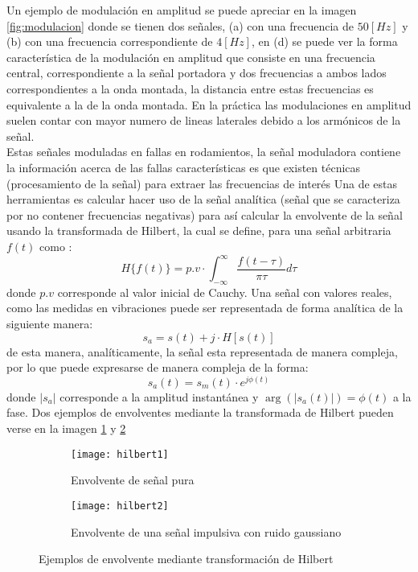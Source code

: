     			Un ejemplo de modulación en amplitud se puede apreciar en la imagen \ref{fig:modulacion} donde se tienen dos señales, (a) con una frecuencia de $50[Hz]$ y (b) con una frecuencia correspondiente de $4[Hz]$, en (d) se puede ver la forma característica de la modulación en amplitud que consiste en una frecuencia central, correspondiente a la señal portadora y dos frecuencias a ambos lados correspondientes a la onda montada, la distancia entre estas frecuencias es equivalente a la de la onda montada. En la práctica las modulaciones en amplitud suelen contar con mayor numero de lineas laterales debido a los armónicos de la señal.\\
    			
    			Estas señales moduladas en fallas en rodamientos, la señal moduladora contiene la información acerca de las fallas características es que existen técnicas (procesamiento de la señal) para extraer las frecuencias de interés Una de estas herramientas es calcular hacer uso de la señal analítica (señal que se caracteriza por no contener frecuencias negativas) para así calcular la envolvente de la señal usando la transformada de Hilbert, la cual se define, para una señal arbitraria $f(t)$ como \cite{Boashash1992}:
    			\begin{equation}
    				H \{f(t)\} = p.v \cdot \int_{-\infty}^{\infty} \frac{f(t-\tau)}{\pi \tau} d\tau
    			\end{equation}
    			donde $p.v$ corresponde al valor inicial de Cauchy. Una señal con valores reales, como las medidas en vibraciones puede ser representada de forma analítica de la siguiente manera:\\
    			\begin{equation}
    				s_{a}=s(t)+j \cdot H[s(t)]
    			\end{equation}
    			de esta manera, analíticamente, la señal esta representada de manera compleja, por lo que puede expresarse de manera compleja de la forma:\\
    			\begin{equation}
    				s_{a}(t) = s_{m}(t) \cdot e^{j\phi (t)}			
    			\end{equation}
    			donde $|s_{a}|$ corresponde a la amplitud instantánea y $\arg\left (|s_{a}(t)|\right )=\phi(t)$ a la fase. Dos ejemplos de envolventes mediante la transformada de Hilbert pueden verse en la imagen \ref{fig:hilbert1} y \ref{fig:hilbert2}
    			\begin{figure}[H]
    				\centering
    				\begin{subfigure}[b]{\linewidth}
    					\texttt{[image: hilbert1]}
    					\caption{Envolvente de señal pura}
    					\label{fig:hilbert1}
    				\end{subfigure}
    				\begin{subfigure}[b]{\linewidth}
    					\texttt{[image: hilbert2]}
    					\caption{Envolvente de una señal impulsiva con ruido gaussiano}
    					\label{fig:hilbert2}
    				\end{subfigure}
    				\caption{Ejemplos de envolvente mediante transformación de Hilbert}
    				\label{fig:hilbert}						
    			\end{figure}
